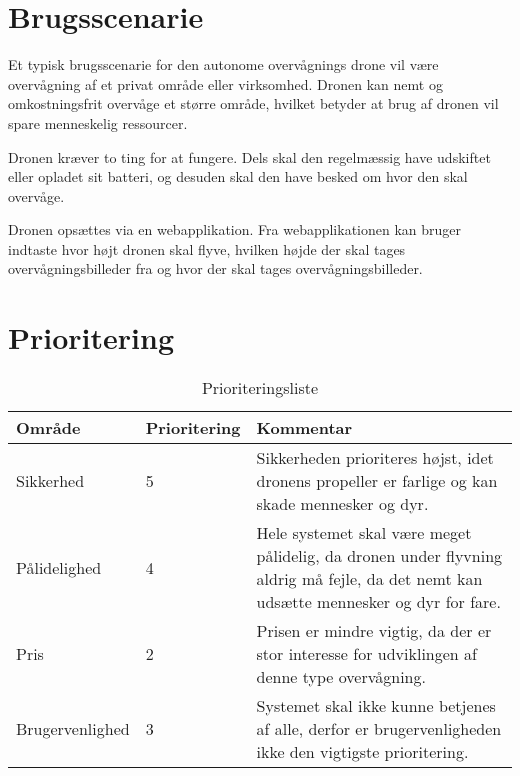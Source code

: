 \section{Brugsscenarie}

Et typisk brugsscenarie for den autonome overvågnings drone vil være overvågning af et privat område eller virksomhed. Dronen kan nemt og omkostningsfrit overvåge et større område, hvilket betyder at brug af dronen vil spare menneskelig ressourcer. 

Dronen kræver to ting for at fungere. Dels skal den regelmæssig have udskiftet eller opladet sit batteri, og desuden skal den have besked om hvor den skal overvåge.

Dronen opsættes via en webapplikation. Fra webapplikationen kan bruger indtaste hvor højt dronen skal flyve, hvilken højde der skal tages overvågningsbilleder fra og hvor der skal tages overvågningsbilleder.



\section{Prioritering}

\begin{table}[H]
	\centering
		\begin{tabular}{|l|l|p{7 cm}|} 
		\hline
			Område & Prioritering & Kommentar \\ \hline
			Sikkerhed 		& 5 	& Sikkerheden prioriteres højst, idet dronens propeller er farlige og kan skade mennesker og dyr.   \\ \hline
			
			Pålidelighed 	& 4 	& Hele systemet skal være meget pålidelig, da dronen under flyvning aldrig må fejle, da det nemt kan udsætte mennesker og dyr for fare.  \\ \hline
			
			Pris 			& 2 	& Prisen er mindre vigtig, da der er stor interesse for udviklingen af denne type overvågning.    \\ \hline
			
			Brugervenlighed & 3 	& Systemet skal ikke kunne betjenes af alle, derfor er brugervenligheden ikke den vigtigste prioritering. \\ \hline
		\end{tabular}
	\caption{Prioriteringsliste}
\end{table}

